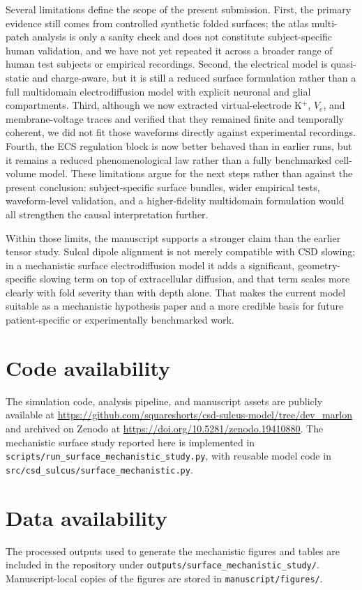 \documentclass[12pt]{article}
\begin{document}
Several limitations define the scope of the present submission. First, the primary evidence still comes from controlled synthetic folded surfaces; the atlas multi-patch analysis is only a sanity check and does not constitute subject-specific human validation, and we have not yet repeated it across a broader range of human test subjects or empirical recordings. Second, the electrical model is quasi-static and charge-aware, but it is still a reduced surface formulation rather than a full multidomain electrodiffusion model with explicit neuronal and glial compartments. Third, although we now extracted virtual-electrode K$^+$, $V_e$, and membrane-voltage traces and verified that they remained finite and temporally coherent, we did not fit those waveforms directly against experimental recordings. Fourth, the ECS regulation block is now better behaved than in earlier runs, but it remains a reduced phenomenological law rather than a fully benchmarked cell-volume model. These limitations argue for the next steps rather than against the present conclusion: subject-specific surface bundles, wider empirical tests, waveform-level validation, and a higher-fidelity multidomain formulation would all strengthen the causal interpretation further.

Within those limits, the manuscript supports a stronger claim than the earlier tensor study. Sulcal dipole alignment is not merely compatible with CSD slowing; in a mechanistic surface electrodiffusion model it adds a significant, geometry-specific slowing term on top of extracellular diffusion, and that term scales more clearly with fold severity than with depth alone. That makes the current model suitable as a mechanistic hypothesis paper and a more credible basis for future patient-specific or experimentally benchmarked work.

\section*{Code availability}
The simulation code, analysis pipeline, and manuscript assets are publicly available at \url{https://github.com/squareshorts/csd-sulcus-model/tree/dev_marlon} and archived on Zenodo at \url{https://doi.org/10.5281/zenodo.19410880}. The mechanistic surface study reported here is implemented in \texttt{scripts/run\_surface\_mechanistic\_study.py}, with reusable model code in \texttt{src/csd\_sulcus/surface\_mechanistic.py}.

\section*{Data availability}
The processed outputs used to generate the mechanistic figures and tables are included in the repository under \texttt{outputs/surface\_mechanistic\_study/}. Manuscript-local copies of the figures are stored in \texttt{manuscript/figures/}.
\end{document}
